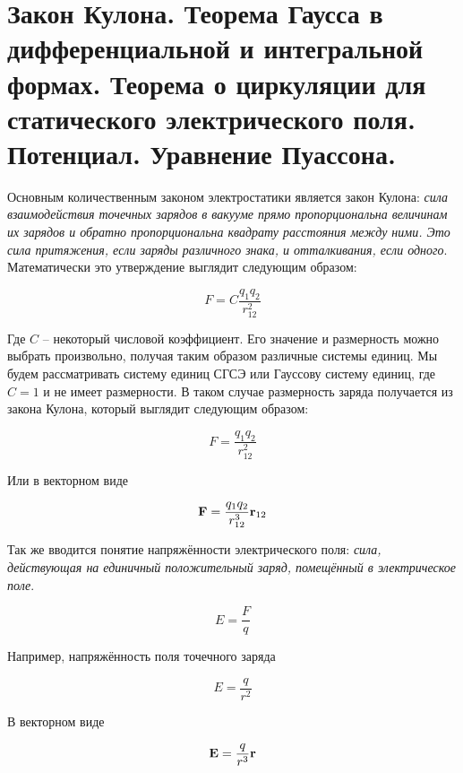 \section{Закон Кулона. Теорема Гаусса в дифференциальной и интегральной формах. Теорема о циркуляции для статического электрического поля. Потенциал. Уравнение Пуассона.}

Основным количественным законом электростатики является закон Кулона: \textit{сила взаимодействия точечных зарядов в вакууме прямо пропорциональна величинам их зарядов и обратно пропорциональна квадрату расстояния между ними. Это сила притяжения, если заряды различного знака, и отталкивания, если одного}. Математически это утверждение выглядит следующим образом:

\begin{equation}
    F = C \frac{q_1 q_2}{r_{12}^2}
\end{equation}

\noindent
Где $C$ -- некоторый числовой коэффициент. Его значение и размерность можно выбрать произвольно, получая таким образом различные системы единиц. Мы будем рассматривать систему единиц СГСЭ или Гауссову систему единиц, где $C = 1$ и не имеет размерности. В таком случае размерность заряда получается из закона Кулона, который выглядит следующим образом:

\begin{equation}
    F = \frac{q_1 q_2}{r_{12}^2}
\end{equation}

\noindent
Или в векторном виде

\begin{equation}
    \mathbf F = \frac{q_1 q_2}{r_{12}^3} \mathbf r_{12}
\end{equation}

Так же вводится понятие напряжённости электрического поля: \textit{сила, действующая на единичный положительный заряд, помещённый в электрическое поле}.

\begin{equation}
    E = \frac{F}{q}
\end{equation}

Например, напряжённость поля точечного заряда

\begin{equation}
    E = \frac{q}{r^2}
\end{equation}

\noindent
В векторном виде

\begin{equation}
    \mathbf E = \frac{q}{r^3} \mathbf r
\end{equation}

